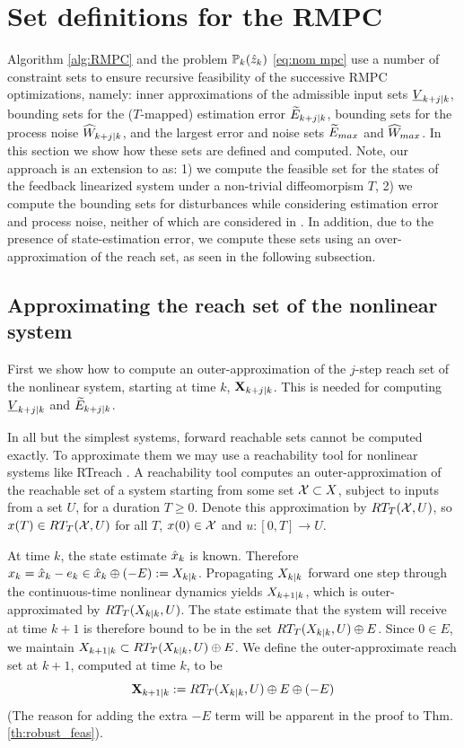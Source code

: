 \section{Set definitions for the RMPC}
\label{sec:set definitions}

Algorithm \ref{alg:RMPC} and the problem $\mathbb{P}_{k}(\hat{z}_{k})$ \eqref{eq:nom mpc} use a number of constraint sets to ensure recursive feasibility of the successive RMPC optimizations, namely: 
inner approximations of the admissible input sets $\underline{V}_{k+j|k}$, 
bounding sets for the ($T$-mapped) estimation error $\widetilde{E}_{k+j|k}$, 
bounding sets for the process noise $\widehat{W}_{k+j|k}$, 
and the largest error and noise sets $\widetilde{E}_{max}$ and $\widehat{W}_{max}$.
In this section we show how these sets are defined and computed. Note, our approach is an extension to \cite{SimonLG13_MPC} as: 1) we compute the feasible set for the states of the feedback linearized system under a non-trivial diffeomorpism $T$, 2) we compute the bounding sets for disturbances while considering estimation error and process noise, neither of which are considered in \cite{SimonLG13_MPC}. In addition, due to the presence of state-estimation error, we compute these sets using an over-approximation of the reach set, as seen in the following subsection.

 \subsection{Approximating the reach set of the nonlinear system}
 \label{sec:x reach}

 First we show how to compute an outer-approximation of the $j$-step reach set of the nonlinear system, starting at time $k$, $ \mathbf{X}_{k+j|k}$.
This is needed for computing $\underline{V}_{k+j|k}$ and $\widetilde{E}_{k+j|k}$.
 
 In all but the simplest systems, forward reachable sets cannot be computed exactly.
 To approximate them we may use a reachability tool for nonlinear systems like RTreach \cite{JohnsonBCS16_Rtreach}.
 A reachability tool computes an outer-approximation of the reachable set of a system starting from some set $\mathcal{X} \subset X$, subject to inputs from a set $U$, for a duration $T \geq 0$. 
 Denote this approximation by $RT_T(\mathcal{X},U)$, so $x(T) \in RT_T(\mathcal{X},U)$ for all $T$, $x(0) \in \mathcal{X}$ and $u:[0,T] \rightarrow U$.
 
 At time $k$, the state estimate $\hat{x}_{k}$ is known.
 Therefore $x_k = \hat{x}_{k} - e_k \in \hat{x}_{k} \oplus (-E) := X_{k|k}$.
 Propagating $X_{k|k}$ forward one step through the continuous-time nonlinear dynamics yields $X_{k+1|k}$, which is outer-approximated by $RT_T(X_{k|k},U)$.
 The state estimate that the system will receive at time $k+1$ is therefore bound to be in the set $RT_T(X_{k|k},U)  \oplus E$.
 Since $0 \in E$, we maintain $X_{k+1|k} \subset RT_T(X_{k|k},U)  \oplus E$.
 We define the outer-approximate reach set at $k+1$, computed at time $k$, to be 
 \begin{equation*}
 \label{eq:def Xk}
 \mathbf{X}_{k+1|k} :=  RT_T(X_{k|k},U)  \oplus E \oplus  (-E)
 \end{equation*}
 (The reason for adding the extra $-E$ term will be apparent in the proof to Thm. \ref{th:robust_feas}).

